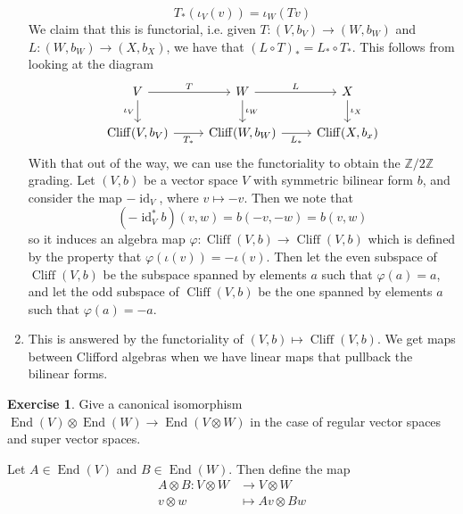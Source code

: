 \documentclass[psamsfonts]{amsart}
\theoremstyle{definition}
\newtheorem{exer}[thm]{Exercise}
\theoremstyle{remark}
\newcommand{\Z}{\mathbb{Z}}
\DeclareMathOperator{\id}{id}
\DeclareMathOperator{\End}{End}
\DeclareMathOperator{\Cliff}{Cliff}
\begin{document}
\begin{enumerate}
$$T_* (\iota_V(v)) = \iota_W(Tv) $$
We claim that this is functorial, i.e. given $T: (V, b_V) \to (W,b_W)$ and $L : (W, b_W) \to (X, b_X)$, we have that $(L \circ T)_* = L_* \circ T_*$. This follows from looking at the diagram
$$\begin{tikzcd} 
V \arrow[d, "\iota_V"']\arrow[r, "T"] & W \arrow[d, "\iota_W"] \arrow[r, "L"] & X \arrow[d, "\iota_X"]\\
\Cliff(V, b_V) \arrow[r, "T_*"'] & \Cliff(W, b_W) \arrow[r, "L_*"'] & \Cliff(X, b_x)
\end{tikzcd}$$
With that out of the way, we can use the functoriality to obtain the $\Z/2\Z$ grading. Let $(V,b)$ be a vector space $V$ with symmetric bilinear form $b$, and consider the map $-\id_V$, where $v \mapsto -v$. Then we note that 
$$(-\id_V^*b)(v,w) = b(-v,-w) = b(v,w)$$
 so it induces an algebra map $\varphi : \Cliff(V,b) \to \Cliff(V,b)$ which is defined by the property that $\varphi(\iota(v)) = -\iota(v)$. Then let the even subspace of $\Cliff(V,b)$ be the subspace spanned by elements $a$ such that $\varphi(a) = a$, and let the odd subspace of $\Cliff(V,b)$ be the one spanned by elements $a$ such that $\varphi(a) = -a$.
 \item This is answered by the functoriality of $(V,b) \mapsto \Cliff(V,b)$. We get maps between Clifford algebras when we have linear maps that pullback the bilinear forms.
\end{enumerate}
%
\begin{exer}
Give a canonical isomorphism $\End(V) \otimes \End(W) \to \End(V \otimes W)$ in the case of regular vector spaces and super vector spaces.
\end{exer}
Let $A \in \End(V)$ and $B \in \End(W)$. Then define the map 
\begin{align*}
A \otimes B : V \otimes W &\to V \otimes W \\
v \otimes w &\mapsto Av \otimes Bw
\end{align*}
\end{document}
